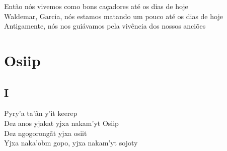 \bigskip

\begin{linenumbers}\begingroup\raggedright
 
\noindent   Então nós vivemos como bons caçadores até os dias de hoje\\
  Waldemar, Garcia, nós estamos matando um pouco até os dias de hoje\\
  Antigamente, nós nos guiávamos pela vivência dos nossos anciões
\end{linenumbers}\endgroup

\chapter{Osiip}


\medskip
\section{I}

\begin{linenumbers}\begingroup\raggedright
  \noindent Pyry'a ta'ãn y'it keerep\\
  Dez anos yjakat yjxa nakam'yt Osiip\\
  Dez ngogorongãt yjxa osiit\\
  Yjxa naka'obm gopo, yjxa nakam'yt sojoty
 
\end{linenumbers}\endgroup

\bigskip

